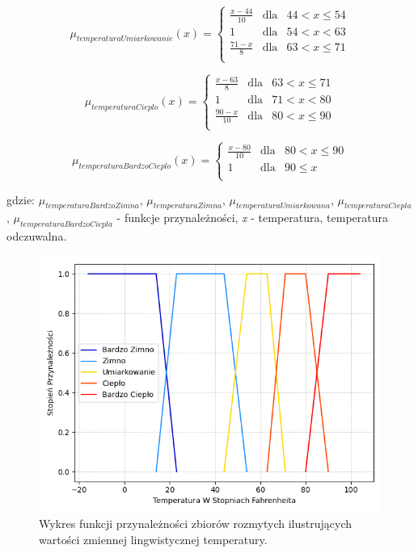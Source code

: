 \documentclass{classrep}
\begin{document}
\begin{equation}
\mu _{temperaturaUmiarkowanie}(x) = \left\{ \begin{array}{rcl}
\frac{x - 44}{10} & \mbox{dla} & 44 < x \leq 54\\
1 & \mbox{dla} & 54 < x < 63\\
\frac{71 - x}{8} & \mbox{dla} & 63 < x \leq 71\\
\end{array}\right.
\end{equation}

\begin{equation}
\mu _{temperaturaCieplo}(x) = \left\{ \begin{array}{rcl}
\frac{x - 63}{8} & \mbox{dla} & 63 < x \leq 71\\
1 & \mbox{dla} & 71 < x < 80\\
\frac{90 - x}{10} & \mbox{dla} & 80 < x \leq 90\\
\end{array}\right.
\end{equation}

\begin{equation}
\mu _{temperaturaBardzoCieplo}(x) = \left\{ \begin{array}{rcl}
\frac{x - 80}{10} & \mbox{dla} & 80 < x \leq 90\\
1 & \mbox{dla} & 90 \leq x\\
\end{array}\right.
\end{equation}

gdzie: \(\mu _{temperaturaBardzoZimna}\), \(\mu _{temperaturaZimna}\), \(\mu _{temperaturaUmiarkowana}\), \(\mu _{temperaturaCiepla}\), \(\mu _{temperaturaBardzoCiepla}\) - funkcje przynależności, \textit{x} - temperatura, temperatura odczuwalna.


\begin{figure}[h!]
\centering
\includegraphics[width=14cm]{FunkcjaPrzynaleznosciTemperatura.png}
\vspace{-0.3cm}
\caption{Wykres funkcji przynależności zbiorów rozmytych ilustrujących wartości zmiennej lingwistycznej temperatury. }
\label{rysunek do eksperymentu 1 wariantu 1}
\end{figure}
\newpage
\end{document}
